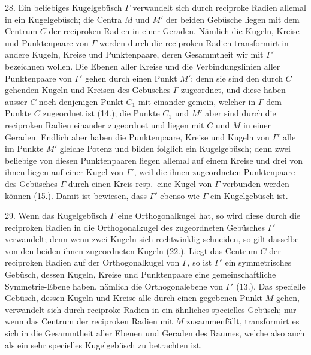 28. Ein beliebiges Kugelgeb\"usch $\varGamma$ verwandelt sich
durch reciproke Radien allemal in ein Kugelgeb\"usch; die
Centra $M$ und $M'$ der beiden Geb\"usche liegen mit dem Centrum
$C$ der reciproken Radien in einer Geraden. N\"amlich
die Kugeln, Kreise und Punktenpaare von $\varGamma$ werden durch
die reciproken Radien transformirt in andere Kugeln, Kreise
und Punktenpaare, deren Gesammtheit wir mit $\varGamma'$ bezeichnen
wollen. Die Ebenen aller Kreise und die Verbindungslinien
aller Punktenpaare von $\varGamma'$ gehen durch einen Punkt $M'$;
denn sie sind den durch $C$ gehenden Kugeln und Kreisen
des Geb\"usches $\varGamma$ zugeordnet, und diese haben ausser $C$ noch
denjenigen Punkt $C_1$ mit einander gemein, welcher in $\varGamma$ dem
Punkte $C$ zugeordnet ist (14.); die Punkte $C_1$ und $M'$ aber
sind durch die reciproken Radien einander zugeordnet und
liegen mit $C$ und $M$ in einer Geraden. Endlich aber haben
die Punktenpaare, Kreise und Kugeln von $\varGamma'$ alle im Punkte
$M'$ gleiche Potenz und bilden folglich ein Kugelgeb\"usch;
denn zwei beliebige von diesen Punktenpaaren liegen allemal
auf einem Kreise und drei von ihnen liegen auf einer Kugel
von $\varGamma'$, weil die ihnen zugeordneten Punktenpaare des Geb\"usches
$\varGamma$ durch einen Kreis resp.\ eine Kugel von $\varGamma$ verbunden
werden k\"onnen (15.). Damit ist bewiesen, dass $\varGamma'$
ebenso wie $\varGamma$ ein Kugelgeb\"usch ist.

29. Wenn das Kugelgeb\"usch $\varGamma$ eine Orthogonalkugel
hat, so wird diese durch die reciproken Radien in die Orthogonalkugel
des zugeordneten Geb\"usches $\varGamma'$ verwandelt;
denn wenn zwei Kugeln sich rechtwinklig schneiden, so gilt
dasselbe von den beiden ihnen zugeordneten Kugeln (22.).
Liegt das Centrum $C$ der reciproken Radien auf der Orthogonalkugel
von $\varGamma$, so ist $\varGamma'$ ein symmetrisches Geb\"usch,
dessen Kugeln, Kreise und Punktenpaare eine gemeinschaftliche
Symmetrie-Ebene haben, n\"amlich die Orthogonalebene
von $\varGamma'$ (13.). Das specielle Geb\"usch, dessen Kugeln und
Kreise alle durch einen gegebenen Punkt $M$ gehen, verwandelt
sich durch reciproke Radien in ein \"ahnliches specielles
Geb\"usch; nur wenn das Centrum der reciproken Radien mit
$M$ zusammenf\"allt, transformirt es sich in die Gesammtheit
aller Ebenen und Geraden des Raumes, welche also auch
als ein sehr specielles Kugelgeb\"usch zu betrachten ist.

